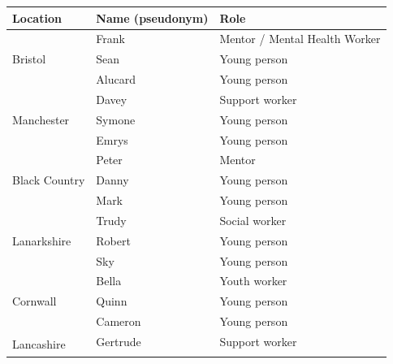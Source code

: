\begin{table}[hbt!]
\centering
\begin{tabular}{|l|l|l|}
\hline
\textbf{Location}              & \textbf{Name (pseudonym)} & \textbf{Role}                 \\ \hline
\multirow{3}{*}{Bristol}       & Frank                     & Mentor / Mental Health Worker \\ \cline{2–3} 
                               & Sean                      & Young person                  \\ \cline{2–3} 
                               & Alucard                   & Young person                  \\ \hline
\multirow{3}{*}{Manchester}    & Davey                     & Support worker                \\ \cline{2–3} 
                               & Symone                    & Young person                  \\ \cline{2–3} 
                               & Emrys                     & Young person                  \\ \hline
\multirow{3}{*}{Black Country} & Peter                     & Mentor                        \\ \cline{2–3} 
                               & Danny                     & Young person                  \\ \cline{2–3} 
                               & Mark                      & Young person                  \\ \hline
\multirow{3}{*}{Lanarkshire}   & Trudy                     & Social worker                 \\ \cline{2–3} 
                               & Robert                    & Young person                  \\ \cline{2–3} 
                               & Sky                       & Young person                  \\ \hline
\multirow{3}{*}{Cornwall}      & Bella                     & Youth worker                  \\ \cline{2–3} 
                               & Quinn                     & Young person                  \\ \cline{2–3} 
                               & Cameron                   & Young person                  \\ \hline
\multirow{3}{*}{Lancashire}    & Gertrude                  & Support worker                \\ \cline{2–3} 

\end{tabular}
\end{table}

